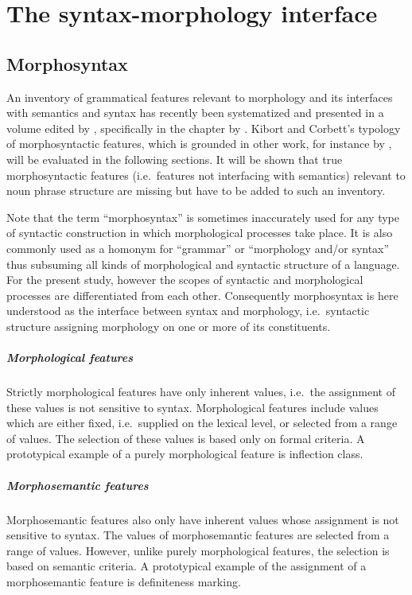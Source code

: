 
\chapter{The syntax-morphology interface} \label{syntax-morphology-interface}

\section{Morphosyntax}
An inventory of grammatical features relevant to morphology and its interfaces with semantics and syntax has recently been systematized and presented in a volume edited by \citet{kibort-etal2010}, specifically in the chapter by \citet{kibort2010a}. Kibort and Corbett's typology of morphosyntactic features, which is grounded in other work, for instance by \citet{aronoff1994,corbett1987,carstairs-mccarthy2000a,corbett2006,corbett-etal2006,bickel-etal2007,kibort2008a}, will be evaluated in the following sections. It will be shown that true morphosyntactic features (i.e.~features not interfacing with semantics) relevant to noun phrase structure are missing but have to be added to such an inventory.

Note that the term “morphosyntax” is sometimes inaccurately used for any type of syntactic construction in which morphological processes take place. It is also commonly used as a homonym for “grammar” or “morphology and/or syntax” thus subsuming all kinds of morphological and syntactic structure of a language. For the present study, however the scopes of syntactic and morphological processes are differentiated from each other. Consequently morphosyntax is here understood as the interface between syntax and morphology, i.e.~syntactic structure assigning morphology on one or more of its constituents.
\paragraph{Morphological features} 
Strictly morphological features have only inherent values, i.e.~the assignment of these values is not sensitive to syntax. Morphological features include values which are either fixed, i.e.~supplied on the lexical level, or selected from a range of values. The selection of these values is based only on formal criteria. A prototypical example of a purely morphological feature is inflection class.
\paragraph{Morphosemantic features} 
Morphosemantic features also only have inherent values whose assignment is not sensitive to syntax. The values of morphosemantic features are selected from a range of values. However, unlike purely morphological features, the selection is based on semantic criteria. A prototypical example of the assignment of a morphosemantic feature is definiteness marking.
